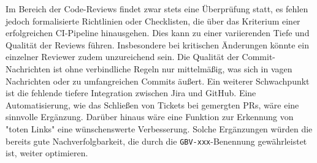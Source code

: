 \documentclass[12pt,oneside]{article}
\begin{document}
    \newline
    Im Bereich der Code-Reviews findet zwar stets eine Überprüfung statt, es fehlen jedoch formalisierte Richtlinien oder Checklisten, die über das Kriterium einer erfolgreichen CI-Pipeline hinausgehen. Dies kann zu einer variierenden Tiefe und Qualität der Reviews führen. Insbesondere bei kritischen Änderungen könnte ein einzelner Reviewer zudem unzureichend sein. Die Qualität der Commit-Nachrichten ist ohne verbindliche Regeln nur mittelmäßig, was sich in vagen Nachrichten oder zu umfangreichen Commits äußert.
    \newline
    Ein weiterer Schwachpunkt ist die fehlende tiefere Integration zwischen Jira und GitHub. Eine Automatisierung, wie das Schließen von Tickets bei gemergten PRs, wäre eine sinnvolle Ergänzung. Darüber hinaus wäre eine Funktion zur Erkennung von "toten Links" eine wünschenswerte Verbesserung. Solche Ergänzungen würden die bereits gute Nachverfolgbarkeit, die durch die \texttt{GBV-xxx}-Benennung gewährleistet ist, weiter optimieren.
\end{document}
